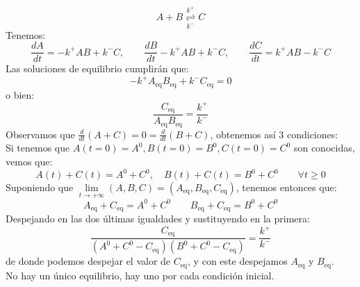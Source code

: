 \begin{ejemplo}
    \begin{equation*}
        A+B \overset{k^+}{\underset{k^-}{\rightleftharpoons}} C
    \end{equation*}
    Tenemos:
    \begin{equation*}
        \frac{dA}{dt}  = -k^+AB + k^-C, \qquad \frac{dB}{dt} -k^+AB + k^-C, \qquad \frac{dC}{dt} = k^+AB - k^-C
    \end{equation*}
    Las soluciones de equilibrio cumplirán que:
    \begin{equation*}
        -k^+ A_{\text{eq}}B_{\text{eq}} + k^-C_{\text{eq}} = 0
    \end{equation*}
    o bien:
    \begin{equation*}
        \boxed{\frac{C_{\text{eq}}}{A_{\text{eq}}B_{\text{eq}}} = \frac{k^+}{k^-}}
    \end{equation*}
    Observamos que $\frac{d}{dt}(A+C) = 0 = \frac{d}{dt} (B+C)$, obtenemos así 3 condiciones:\\

    \noindent
    Si tenemos que $A(t=0) = A^0, B(t=0)=B^0, C(t=0)=C^0$ son conocidas, vemos que:
    \begin{equation*}
        A(t) + C(t) = A^0 + C^0, \quad B(t)+C(t) = B^0 + C^0 \qquad \forall t\geq 0
    \end{equation*}
    Suponiendo que $\lim\limits_{t\to+\infty}(A,B,C) = (A_{\text{eq}}, B_{\text{eq}}, C_{\text{eq}})$, tenemos entonces que:
    \begin{equation*}
        \boxed{A_{\text{eq}} + C_{\text{eq}} = A^0 + C^0}\qquad \boxed{B_{\text{eq}}+C_{\text{eq}} = B^0 + C^0}
    \end{equation*}
    Despejando en las dos últimas igualdades y sustituyendo en la primera:
    \begin{equation*}
        \boxed{\frac{C_{\text{eq}}}{(A^0 + C^0 - C_{\text{eq}})(B^0 + C^0 - C_{\text{eq}})}= \frac{k^+}{k^-}}
    \end{equation*}
    de donde podemos despejar el valor de $C_{\text{eq}}$, y con este despejamos $A_{\text{eq}}$ y $B_{\text{eq}}$.\\

    \noindent
    No hay un único equilibrio, hay uno por cada condición inicial.
\end{ejemplo}
